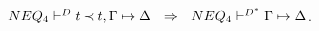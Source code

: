 %
\begin{LEMMA}\label{le:nott} ${NEQ_4}\vdash^{{D}}t\mathbin{\prec} t,\Gamma\mathrel{\mapsto}\Delta  
\ \ \Rightarrow \ \ {NEQ_4}\vdash^{{D^*}}\Gamma\mathrel{\mapsto}\Delta$.
\end{LEMMA}
